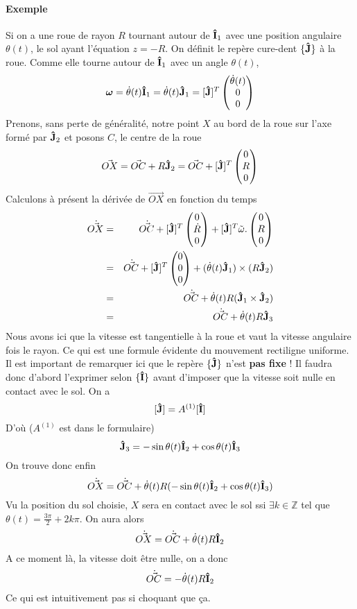 \documentclass[11pt,a4paper]{article} %
\newcommand\ui{{\bf\hat{I}}} %
\newcommand\uj{{\bf\hat{J}}} %
\newcommand\omegaf{{\bm \omega}}
\newcommand\omegat{\tilde{\omega}}
\begin{document}
\paragraph{Exemple}
Si on a une roue de rayon $R$ tournant autour de $\ui_1$ avec une position angulaire $\theta(t)$, le sol ayant l'équation $z = -R$.
On définit le repère cure-dent $\{\uj\}$ à la roue.
Comme elle tourne autour de $\ui_1$ avec un angle $\theta(t)$,
\[ \omegaf = \dot{\theta}(t) \ui_1 = \dot{\theta}(t) \uj_1 = [\uj]^T \begin{pmatrix}\dot{\theta}(t)\\0\\0\end{pmatrix} \]
Prenons, sans perte de généralité, notre point $X$ au bord de la roue sur l'axe formé par $\uj_2$ et posons $C$, le centre de la roue
\[ \vec{OX} = \vec{OC} + R \uj_2 = \vec{OC} + [\uj]^T \begin{pmatrix}0\\R\\0\end{pmatrix} \]
Calculons à présent la dérivée de $\vec{OX}$ en fonction du temps
\begin{eqnarray*}
	\dot{\vec{OX}} &=& \dot{\vec{OC}} + [\uj]^T \begin{pmatrix}0\\\dot{R}\\0\end{pmatrix} + [\uj]^T \omegat . \begin{pmatrix}0\\R\\0\end{pmatrix}\\
	&=& \dot{\vec{OC}} + [\uj]^T \begin{pmatrix}0\\0\\0\end{pmatrix} + (\dot{\theta}(t) \uj_1) \times (R \uj_2)\\
	&=& \dot{\vec{OC}} + \dot{\theta}(t) R (\uj_1 \times \uj_2)\\
	&=& \dot{\vec{OC}} + \dot{\theta}(t) R \uj_3\\
\end{eqnarray*}
Nous avons ici que la vitesse est tangentielle à la roue et vaut la vitesse angulaire fois le rayon.
Ce qui est une formule évidente du mouvement rectiligne uniforme.
Il est important de remarquer ici que le repère $\{\uj\}$ n'est {\bf pas fixe} !
Il faudra donc d'abord l'exprimer selon $\{\ui\}$ avant d'imposer que la vitesse soit nulle en contact avec le sol.
On a
\[ [\uj] = A^{(1)} [\ui] \]
D'où ($A^{(1)}$ est dans le formulaire)
\[ \uj_3 = -\sin\theta(t) \ui_2 + \cos\theta(t) \ui_3 \]
On trouve donc enfin
\[ \dot{\vec{OX}} = \dot{\vec{OC}} + \dot{\theta}(t) R (-\sin\theta(t) \ui_2 + \cos\theta(t) \ui_3) \]
Vu la position du sol choisie, $X$ sera en contact avec le sol ssi $\exists k \in \mathbb{Z}$ tel que $\theta(t) = \frac{3\pi}{2} + 2k\pi$.
On aura alors
\[ \dot{\vec{OX}} = \dot{\vec{OC}} + \dot{\theta}(t) R \ui_2 \]
A ce moment là, la vitesse doit être nulle, on a donc
\[ \dot{\vec{OC}} = -\dot{\theta}(t) R \ui_2 \]
Ce qui est intuitivement pas si choquant que ça.
\end{document}
